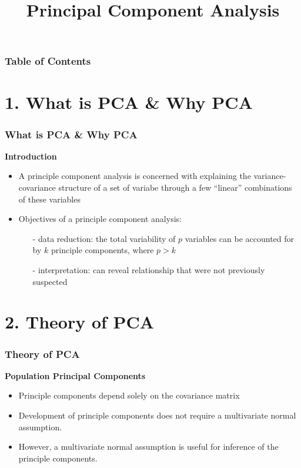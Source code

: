 \documentclass[a4paper]{beamer}
\title{Principal Component Analysis}
\author{}
\institute{National Chengchi University\\ Department of Statistics}
\date{}
\newenvironment{bigtitle}{\begin{center}\begin{large}\bfseries}{\end{large}\end{center}\vspace{-6pt}}
\begin{document}
\frame{\titlepage}

\begin{frame}
\frametitle{Table of Contents}
\tableofcontents
\end{frame}

\section{1. What is PCA \& Why PCA}
\begin{frame}
\frametitle{What is PCA \& Why PCA}
\begin{bigtitle}
Introduction
\end{bigtitle}
\begin{itemize}
\item A principle component analysis is concerned with explaining the variance-covariance structure of a set of variabe through a few ``linear'' combinations of these variables
\end{itemize}
\begin{itemize}
\item Objectives of a principle component analysis:
\begin{itemize}
	\item[-] data reduction: the total variability of $p$ variables can be accounted for by $k$ principle components, where $p>k$
	\item[-] interpretation: can reveal relationship that were not previously suspected
	
\end{itemize}
\end{itemize}
\end{frame}

\section{2. Theory of PCA}
\begin{frame}
\frametitle{Theory of PCA}
\begin{bigtitle}
Population Principal Components
\end{bigtitle}
\begin{itemize}
\item Principle components depend solely on the covariance matrix
\item Development of principle components does not require a multivariate normal assumption.
\item However, a multivariate normal assumption is useful for inference of the principle components.
\end{itemize}
\end{frame}
\end{document}
